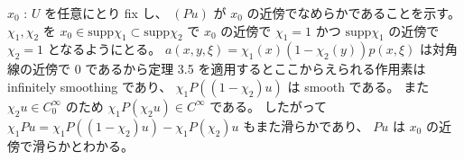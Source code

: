 \begin{Proof}
\itemprof
  \(x_0\) : \(U\) を任意にとり fix し、 \((P u)\) が \(x_0\) の近傍でなめらかであることを示す。
  \(\chi_1 , \chi_2\) を \(x_0 \in \text{supp} \chi_1 \subset \text{supp} \chi_2\) で \(x_0\) の近傍で \(\chi_1 = 1\) かつ \(\text{supp} \chi_1\) の近傍で \(\chi_2 = 1\) となるようにとる。
  \(a(x,y,\xi) = \chi_1(x) (1 - \chi_2(y)) p(x,\xi)\) は対角線の近傍で \(0\) であるから定理 3.5 を適用するとここからえられる作用素は infinitely smoothing であり、 \(\chi_1 P ((1 - \chi_2) u)\) は smooth である。
  また \(\chi_2 u \in C^\infty_0\) のため \(\chi_1 P(\chi_2 u) \in C^\infty\) である。
  したがって \(\chi_1 P u = \chi_1 P ((1 - \chi_2) u) - \chi_1 P (\chi_2) u\) もまた滑らかであり、 \(P u\) は \(x_0\) の近傍で滑らかとわかる。
\end{Proof}